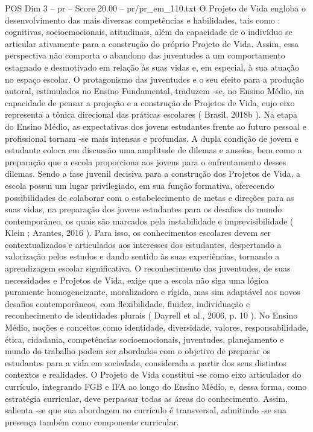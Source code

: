 \begin{textsample}{POS Dim 3 – pr – Score 20.00 – pr/pr\_em\_110.txt}
O Projeto de Vida engloba o desenvolvimento das mais diversas competências e habilidades, tais como : cognitivas, socioemocionais, atitudinais, além da capacidade de o indivíduo se articular ativamente para a construção do próprio Projeto de Vida.
Assim, essa perspectiva não comporta o abandono das juventudes a um comportamento estagnado e desmotivado em relação às suas vidas e, em especial, à sua atuação no espaço escolar.
O protagonismo das juventudes e o seu efeito para a produção autoral, estimulados no Ensino Fundamental, traduzem -se, no Ensino Médio, na capacidade de pensar a projeção e a construção de Projetos de Vida, cujo eixo representa a tônica direcional das práticas escolares ( Brasil, 2018b ).
Na etapa do Ensino Médio, as expectativas dos jovens estudantes frente ao futuro pessoal e profissional tornam -se mais intensas e profundas.
A dupla condição de jovem e estudante coloca em discussão uma amplitude de dilemas e anseios, bem como a preparação que a escola proporciona aos jovens para o enfrentamento desses dilemas.
Sendo a fase juvenil decisiva para a construção dos Projetos de Vida, a escola possui um lugar privilegiado, em sua função formativa, oferecendo possibilidades de colaborar com o estabelecimento de metas e direções para as suas vidas, na preparação dos jovens estudantes para os desafios do mundo contemporâneo, os quais são marcados pela instabilidade e imprevisibilidade ( Klein ; Arantes, 2016 ).
Para isso, os conhecimentos escolares devem ser contextualizados e articulados aos interesses dos estudantes, despertando a valorização pelos estudos e dando sentido às suas experiências, tornando a aprendizagem escolar significativa.
O reconhecimento das juventudes, de suas necessidades e Projetos de Vida, exige que a escola não siga uma lógica puramente homogeneizante, moralizadora e rígida, mas sim adaptável aos novos desafios contemporâneos, com flexibilidade, fluidez, individuação e reconhecimento de identidades plurais ( Dayrell et al., 2006, p. 10 ).
No Ensino Médio, noções e conceitos como identidade, diversidade, valores, responsabilidade, ética, cidadania, competências socioemocionais, juventudes, planejamento e mundo do trabalho podem ser abordados com o objetivo de preparar os estudantes para a vida em sociedade, considerada a partir dos seus distintos contextos e realidades.
O Projeto de Vida constitui -se como eixo articulador do currículo, integrando FGB e IFA ao longo do Ensino Médio, e, dessa forma, como estratégia curricular, deve perpassar todas as áreas do conhecimento.
Assim, salienta -se que sua abordagem no currículo é transversal, admitindo -se sua presença também como componente curricular.

\end{textsample}
